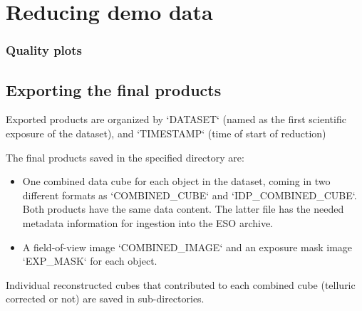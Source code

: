 
\section{Reducing demo data}
\label{sec:reducing_demo_data}



 
\subsubsection{Quality plots}


\subsection{Exporting the final products}
\label{sec:export_final_products}



 
 
Exported products are organized by `DATASET` (named as the first
scientific exposure of the dataset), and `TIMESTAMP` (time of start of
reduction)

The final products saved in the specified directory are: 



\begin{itemize}

 \item One combined data cube for each object in the dataset, coming
   in two different formats as `COMBINED\_CUBE` and
   `IDP\_COMBINED\_CUBE`. Both products have the same data content.
   The latter file has the needed metadata information for ingestion
   into the ESO archive.

 \item A field-of-view image `COMBINED\_IMAGE` and an exposure mask
   image `EXP\_MASK` for each object.


\end{itemize}

Individual reconstructed cubes that contributed to each combined cube (telluric corrected or not) are saved in sub-directories.
